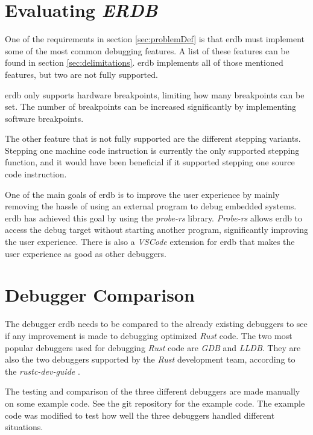 \section{Evaluating \emph{ERDB}} %
One of the requirements in section \ref{sec:problemDef} is that \gls{erdb} must implement some of the most common debugging features.
A list of these features can be found in section \ref{sec:delimitations}.
\gls{erdb} implements all of those mentioned features, but two are not fully supported.


\gls{erdb} only supports hardware breakpoints, limiting how many breakpoints can be set.
The number of breakpoints can be increased significantly by implementing software breakpoints.


The other feature that is not fully supported are the different stepping variants.
Stepping one machine code instruction is currently the only supported stepping function, and it would have been beneficial if it supported stepping one source code instruction.


One of the main goals of \gls{erdb} is to improve the user experience by mainly removing the hassle of using an external program to debug embedded systems.
\gls{erdb} has achieved this goal by using the \emph{probe-rs} library.
\emph{Probe-rs} allows \gls{erdb} to access the debug target without starting another program, significantly improving the user experience.
There is also a \emph{VSCode} extension for \gls{erdb} that makes the user experience as good as other debuggers.



\section{Debugger Comparison} %
\label{sec:debuggercomparison}
The debugger \gls{erdb} needs to be compared to the already existing debuggers to see if any improvement is made to debugging optimized \emph{Rust} code.
The two most popular debuggers used for debugging \emph{Rust} code are \emph{GDB} and \emph{LLDB}.
They are also the two debuggers supported by the \emph{Rust} development team, according to the \emph{rustc-dev-guide} \cite{rust-dev-guide}.


The testing and comparison of the three different debuggers are made manually on some example code.
See the git repository \cite{example-code} for the example code.
The example code was modified to test how well the three debuggers handled different situations.


